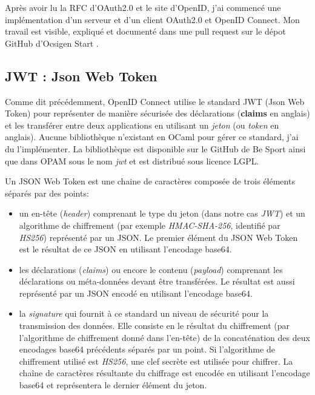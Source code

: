 Après avoir lu la RFC d'OAuth2.0 et le site d'OpenID, j'ai commencé une implémentation d'un serveur
et d'un client OAuth2.0 et OpenID Connect. Mon travail est visible, expliqué et documenté
dans une pull request sur le dépot GitHub d'Ocsigen Start \cite{ocsigen-start-github}.


\subsection{JWT : Json Web Token}

Comme dit précédemment, OpenID Connect utilise le standard JWT (Json Web
Token)\cite{official-jwt-website, official-openid-connect-website, rfc-jwt}
pour représenter de manière sécurisée des déclarations (\textbf{claims} en anglais) et les
transférer entre deux applications en utilisant un \textit{jeton} (ou
\textit{token} en anglais).
Aucune bibliothèque n'existant en OCaml pour gérer ce standard, j'ai du
l'implémenter. La bibliothèque est disponible sur le GitHub de Be
Sport\cite{ocaml-jwt-github} ainsi que
dans OPAM sous le nom \emph{jwt} et est distribué sous licence LGPL.

Un JSON Web Token est une chaine de caractères composée de trois éléments séparés
par des points:
\begin{itemize}
  \item un en-tête (\textit{header}) comprenant le type du jeton (dans notre cas
    \emph{JWT}) et un algorithme de chiffrement (par exemple
    \emph{HMAC-SHA-256}, identifié par \emph{HS256})
    représenté par un JSON. Le premier élément du JSON Web Token est le
    résultat de ce JSON en utilisant l'encodage base64\cite{rfc-base64}.
  \item les déclarations (\textit{claims}) ou encore le contenu
    (\textit{payload}) comprenant les déclarations ou méta-données devant être
transférées. Le résultat est aussi représenté par un JSON encodé en utilisant
l'encodage base64.
  \item la \textit{signature} qui fournit à ce standard un niveau de sécurité
    pour la transmission des données. Elle consiste en le résultat du chiffrement
    (par l'algorithme de chiffrement donné dans l'en-tête) de la concaténation des
    deux encodages base64 précédents séparés par un point. Si l'algorithme de
    chiffrement utilisé est \emph{HS256}, une clef secrète est utilisée pour
    chiffrer. La chaîne de caractères résultante du chiffrage est encodée en
    utilisant l'encodage base64 et représentera le dernier élément du jeton.
\end{itemize}

